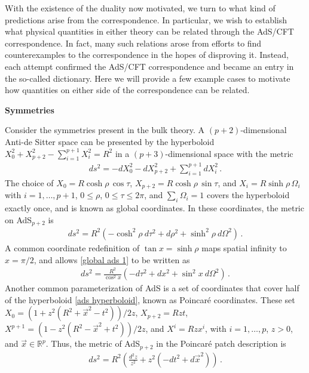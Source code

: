 \documentclass[../PhD.tex]{subfiles}
\begin{document}
\vspace{-0.1in}

With the existence of the duality now motivated, we turn to what kind of predictions arise from the correspondence. In particular, we wish to establish what physical quantities in either theory can be related through the AdS/CFT correspondence. In fact, many such relations arose from efforts to find counterexamples to the correspondence in the hopes of disproving it. Instead, each attempt confirmed the AdS/CFT correspondence and became an entry in the so-called dictionary. Here we will provide a few example cases to motivate how quantities on either side of the correspondence can be related.

{\bf Symmetries}

Consider the symmetries present in the \ads bulk theory. A $(p+2)$-dimensional Anti-de Sitter space can be presented by the hyperboloid $X_0^2 + X^2_{p+2} - \sum^{p+1}_{i=1} X_i^2 = R^2$ in a $(p+3)$-dimensional space with the metric
\begin{align}
\label{ads hyperboloid}
ds^2 = -dX_0^2 - dX_{p+2}^2 + \sum^{p+1}_{i = 1} dX^2_i \, .
\end{align}
The choice of {$X_0 = R \cosh \rho \, \cos \tau$}, {$X_{p+2} = R\cosh \rho \,\sin \tau$}, and {$X_i = R \sinh \rho \,\Omega_i$} with $i=1,\ldots,p + 1$, $0 \leq \rho$, $0 \leq \tau \leq 2\pi$, and $\sum_i \Omega_i = 1$ covers the hyperboloid exactly once, and is known as global coordinates. In these coordinates, the metric on AdS$_{p+2}$ is
\begin{align}
\label{global ads 1}
ds^2 = R^2 \left( - \cosh^2 \rho~d\tau^2 + d \rho^2 + \sinh^2 \rho~d\Omega^2 \right) \, .
\end{align}
A common coordinate redefinition of $\tan x = \sinh \rho$ maps spatial infinity to $x = \pi / 2$, and allows \eqref{global ads 1} to be written as
\begin{align}
\label{global ads 2}
ds^2 = \frac{R^2}{\cos^2 x} \left( - d\tau^2 + dx^2 + \sin^2 x~d\Omega^2 \right) \, .
\end{align}
Another common parameterization of AdS is a set of coordinates that cover half of the hyperboloid \eqref{ads hyperboloid}, known as Poincar\'e coordinates. These set {$X_0 = (1 + z^2 (R^2 + {\vec x}^2 - t^2) )/2z$}, {$X_{p+2} = Rz t$}, {$X^{p+1} = ( 1 - z^2 (R^2 - {\vec x}^2 + t^2) )/ 2z$}, and {$X^i = Rzx^i$}, with {$i = 1, \ldots, p$}, {$z > 0$}, and {$\vec x \in \mathbb{R}^p$}. Thus, the metric of AdS$_{p+2}$ in the Poincar\'e patch description is
\begin{align}
\label{poincare ads}
ds^2 = R^2 \left( \frac{d^2z}{z^2} + z^2 (- dt^2 + d {\vec x}^2) \right) \, .
\end{align}
\end{document}
